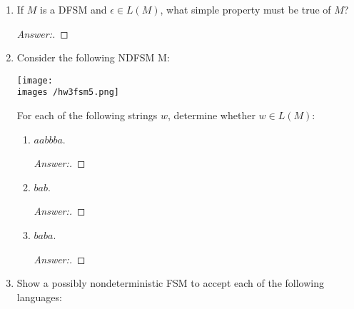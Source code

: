 \documentclass[10pt]{article}
\newcommand{\images}{/home/gparker/classes/341/images}
\begin{document}
\begin{enumerate}
\begin{enumerate}
\item
Define an alphabet $\Sigma$ and describe a technique for encoding Rock, Paper, Scissors games as strings over $\Sigma$. (Hint: each symbol in $\Sigma$ should correspond to an ordered pair that describes the simultaneous actions of $A$ and $B$.)
\begin{proof}[Answer:]
\end{proof}

\item
Let $L_{RPS}$ be the language of Rock, Paper, Scissors games, encoded as strings as described in part (a), that correspond to wins for player $A$.  Show a DFSM that accepts $L_{RPS}$.
\begin{proof}[Answer:]
\end{proof}
\end{enumerate}


\item
If $M$ is a DFSM and $\epsilon \in L(M)$, what simple property must be true of $M$?
\begin{proof}[Answer:]
\end{proof}


\item
Consider the following NDFSM M: \\

\begin{center}
\texttt{[image: \\images /hw3fsm5.png]}
\end{center}

For each of the following strings $w$, determine whether $w \in L(M)$:
\begin{enumerate}
\item
$aabbba$.
\begin{proof}[Answer:]
\end{proof}

\item
$bab$.
\begin{proof}[Answer:]
\end{proof}

\item
$baba$.
\begin{proof}[Answer:]
\end{proof}
\end{enumerate}

\item
Show a possibly nondeterministic FSM to accept each of the following languages:
\begin{enumerate}


\end{enumerate}
\end{enumerate}
\end{document}
